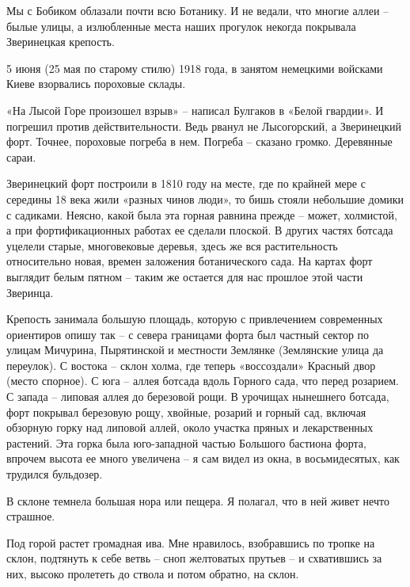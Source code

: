 Мы с Бобиком облазали почти всю Ботанику. И не ведали, что многие аллеи – былые улицы, а излюбленные места наших прогулок некогда покрывала Зверинецкая крепость.

5 июня (25 мая по старому стилю) 1918 года, в занятом немецкими войсками Киеве взорвались пороховые склады.

«На Лысой Горе произошел взрыв» – написал Булгаков в «Белой гвардии». И погрешил против действительности. Ведь рванул не Лысогорский, а Зверинецкий форт. Точнее, пороховые погреба в нем. Погреба – сказано громко. Деревянные сараи.

Зверинецкий форт построили в 1810 году на месте, где по крайней мере с середины 18 века жили «разных чинов люди», то бишь стояли небольшие домики с садиками. Неясно, какой была эта горная равнина прежде – может, холмистой, а при фортификационных работах ее сделали плоской. В других частях ботсада уцелели старые, многовековые деревья, здесь же вся растительность относительно новая, времен заложения ботанического сада. На картах форт выглядит белым пятном – таким же остается для нас прошлое этой части Зверинца.


Крепость занимала большую площадь, которую с привлечением современных ориентиров опишу так – с севера границами форта был частный сектор по улицам Мичурина, Пырятинской и местности Землянке (Землянские улица да переулок). С востока – склон холма, где теперь «воссоздали» Красный двор (место спорное). С юга – аллея ботсада вдоль Горного сада, что перед розарием. С запада – липовая аллея до березовой рощи. В урочищах нынешнего ботсада, форт покрывал березовую рощу, хвойные, розарий и горный сад, включая обзорную горку над липовой аллей, около участка пряных и лекарственных растений. Эта горка была юго-западной частью Большого бастиона форта, впрочем высота ее много увеличена – я сам видел из окна, в восьмидесятых, как трудился бульдозер.

В склоне темнела большая нора или пещера. Я полагал, что в ней живет нечто страшное.

Под горой растет громадная ива. Мне нравилось, взобравшись по тропке на склон, подтянуть к себе ветвь – сноп желтоватых прутьев – и схватившись за них, высоко пролететь до ствола и потом обратно, на склон.

